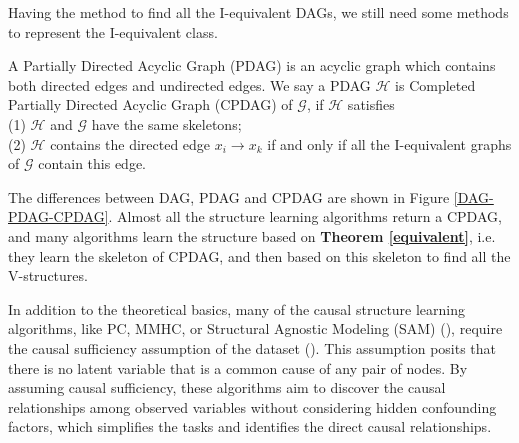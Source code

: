 \documentclass[twoside,11pt]{article}
\begin{document}
Having the method to find all the I-equivalent DAGs, we still need some methods to represent the I-equivalent class.
\begin{definition}
A Partially Directed Acyclic Graph (PDAG) is an acyclic graph which contains both directed edges and undirected edges. We say a PDAG $\mathcal H$ is Completed Partially Directed Acyclic Graph (CPDAG) of $\mathcal G$, if $\mathcal H$ satisfies\\
(1) $\mathcal H$ and $\mathcal G$ have the same skeletons; \\
(2) $\mathcal H$ contains the directed edge $x_i\to x_k$ if and only if all the I-equivalent graphs of $\mathcal G$ contain this edge.
\end{definition}


\begin{figure*}[htbp]
\centering

\caption{(a), (b) and (c) are examples of Bayesian networks, PDAG, and CPDAG. (a) is also a DAG since it has no cycle. (b) has both directed and undirected edges, but it is not CPDAG since it changes the V-structure of (a). (c) is the CPDAG of (a), it keeps the V-structure $x_4\to x_2\gets x_3$. (c) also keeps $x_2\to x_5$, since if we reverse the direction of this edge, it will form a new V-structure and the new graphs will not be I-equivalent to (a) anymore.}\label{DAG-PDAG-CPDAG}
\end{figure*}

The differences between DAG, PDAG and CPDAG are shown in Figure \ref{DAG-PDAG-CPDAG}.
Almost all the structure learning algorithms return a CPDAG, and many algorithms learn the structure based on \textbf{Theorem \ref{equivalent}}, i.e. they learn the skeleton of CPDAG, and then based on this skeleton to find all the V-structures. 

In addition to the theoretical basics, many of the causal structure learning algorithms, like PC, MMHC, or Structural Agnostic Modeling (SAM) (\cite{kalainathan2022structural}), require the causal sufficiency assumption of the dataset (\cite{eberhardt2007interventions}). This assumption posits that there is no latent variable that is a common cause of any pair of nodes. By assuming causal sufficiency, these algorithms aim to discover the causal relationships among observed variables without considering hidden confounding factors, which simplifies the tasks and identifies the direct causal relationships.
\end{document}
